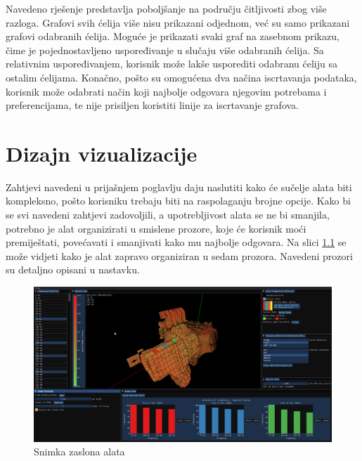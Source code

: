 \documentclass[times, utf8, diplomski]{fer}
\begin{document}
Navedeno rješenje predstavlja poboljšanje na području čitljivosti zbog više razloga. Grafovi svih ćelija više nisu prikazani odjednom, već su samo prikazani grafovi odabranih ćelija. Moguće je prikazati svaki graf na zasebnom prikazu, čime je pojednostavljeno uspoređivanje u slučaju više odabranih ćelija. Sa relativnim uspoređivanjem, korisnik može lakše usporediti odabranu ćeliju sa ostalim ćelijama. Konačno, pošto su omogućena dva načina iscrtavanja podataka, korisnik može odabrati način koji najbolje odgovara njegovim potrebama i preferencijama, te nije prisiljen koristiti linije za iscrtavanje grafova.

\chapter{Dizajn vizualizacije}

Zahtjevi navedeni u prijašnjem poglavlju daju naslutiti kako će sučelje alata biti kompleksno, pošto korisniku trebaju biti na raspolaganju brojne opcije. Kako bi se svi navedeni zahtjevi zadovoljili, a upotrebljivost alata se ne bi smanjila, potrebno je alat organizirati u smislene prozore, koje će korisnik moći premiještati, povećavati i smanjivati kako mu najbolje odgovara. Na slici \ref{fig:gen-screen} se može vidjeti kako je alat zapravo organiziran u sedam prozora. Navedeni prozori su detaljno opisani u nastavku.\\

\begin{figure}[H]
\centering
\includegraphics[width=\linewidth]{general_screenshot.png}
\caption{Snimka zaslona alata}
\label{fig:gen-screen}
\end{figure}
\end{document}

